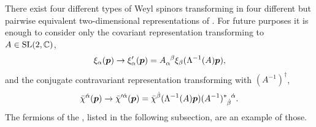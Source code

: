 There exist four different types of Weyl spinors transforming in four different but pairwise equivalent two-dimensional representations of \SLtwoC. For future purposes it is enough to consider only the covariant representation transforming \wrt to $ A \in \mathrm{SL}(2, \mathbb{C}) $,
\begin{equation}
	\begin{aligned}
		\xi_{\alpha}(\vector{p}) \rightarrow \xi^{\prime}_{\alpha}(\vector{p}) = \tensor{A}{_\alpha^\beta} \xi_{\beta}(\Lambda^{-1}(A) \vector{p}),
		\label{eq:SL2C1} 
	\end{aligned}
\end{equation}
and the conjugate contravariant representation transforming with $ (A^{-1})^{\dagger} $,
\begin{equation}
	\begin{aligned}
		\bar{\chi}^{\dot{\alpha}}(\vector{p}) \rightarrow \bar{\chi}^{\prime \dot{\alpha}}(\vector{p}) = \bar{\chi}^{\dot{\beta}}(\Lambda^{-1}(A) \vector{p}) \tensor{(A^{-1})}{^*_{\dot{\beta}}^{\dot{\alpha}}}.
		\label{eq:SL2C2}
	\end{aligned}
\end{equation}
The fermions of the \sm{}, listed in the following subsection, are an example of those.

